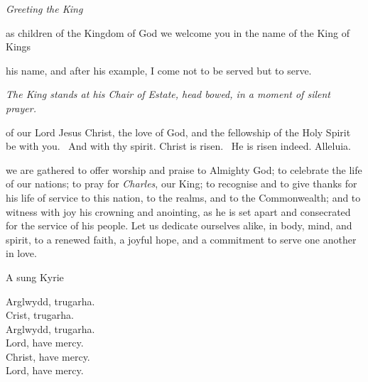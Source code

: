 {\vfill

\clearpage
\begin{center}
	\large\textit{\color{qred}Greeting the King}
\end{center}


\noindent{\itshape\textcolor{qred}{Young Person (Chapel Royal chorister):}}

 as children of the Kingdom of God we welcome you in the name of
the King of Kings

\vfill




 his name, and after his example, I come not to be served but to serve.


\vfill





\noindent\textit{\color{qred}The King stands at his Chair of Estate,
head bowed, in a moment of silent prayer.}

\clearpage



 of our Lord Jesus Christ,
the love of God,
and the fellowship of the Holy Spirit
be with you.  \rspns\ And with thy spirit.
\vfill
{} Christ is risen. \rspns\ He is risen indeed. Alleluia.

\vfill


we are gathered to offer worship
and praise to Almighty God;
to celebrate the life of our nations;
to pray for \textit{Charles}, our King;
to recognise and to give thanks for his life of service to this nation, to the
realms, and to the Commonwealth;
and to witness with joy
his crowning and anointing,
as he is set apart and consecrated
for the service of his people.
Let us dedicate ourselves alike,
in body, mind, and spirit,
to a renewed faith, a joyful hope,
and a commitment to serve one
another in love.

{A sung Kyrie}

\begin{center}

Arglwydd, trugarha.\\
Crist, trugarha.\\
Arglwydd, trugarha.\\
Lord, have mercy.\\
Christ, have mercy.\\
Lord, have mercy.\\
\end{center}


}

